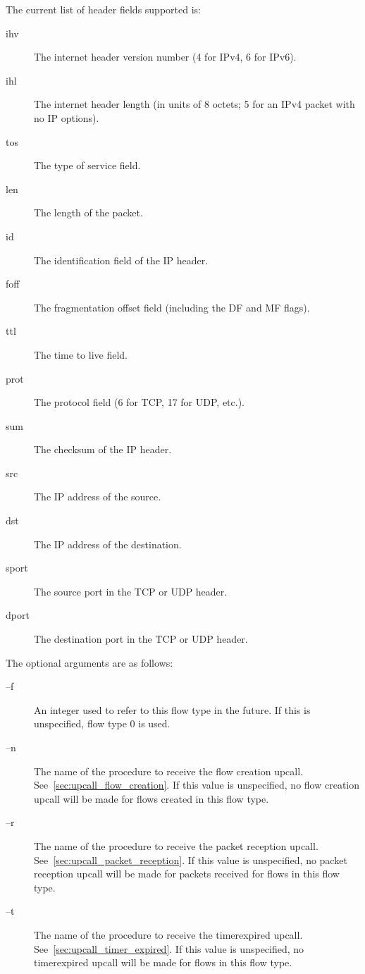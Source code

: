 \documentclass{article}
\begin{document}
The current list of header fields supported is:
\begin{description}
\item[ihv] The internet header version number (4 for IPv4, 6 for IPv6).
\item[ihl] The internet header length (in units of 8 octets; 5 for an
IPv4 packet with no IP options).
\item[tos] The type of service field.
\item[len] The length of the packet.
\item[id] The identification field of the IP header.
\item[foff] The fragmentation offset field (including the DF and MF
flags).
\item[ttl] The time to live field.
\item[prot] The protocol field (6 for TCP, 17 for UDP, etc.).
\item[sum] The checksum of the IP header.
\item[src] The IP address of the source.
\item[dst] The IP address of the destination.
\item[sport] The source port in the TCP or UDP header.
\item[dport] The destination port in the TCP or UDP header.
\end{description}

The optional arguments are as follows:

\begin{description}
\item[--f] An integer used to refer to this flow type in the future.
If this is unspecified, flow type 0 is used.
\item[--n] The name of the procedure to receive the flow creation
upcall.  See~\ref{sec:upcall_flow_creation}.  If
this value is unspecified, no flow creation upcall will be made for
flows created in this flow type.
\item[--r] The name of the procedure to receive the packet reception
upcall.  See~\ref{sec:upcall_packet_reception}.  If this value is unspecified,
no packet reception upcall will be made for packets received for flows
in this flow type.
\item[--t] The name of the procedure to receive the timerexpired upcall.
See~\ref{sec:upcall_timer_expired}.  If this value is unspecified,
no timerexpired upcall will be made for flows in this flow type.
\end{description}
\end{document}
